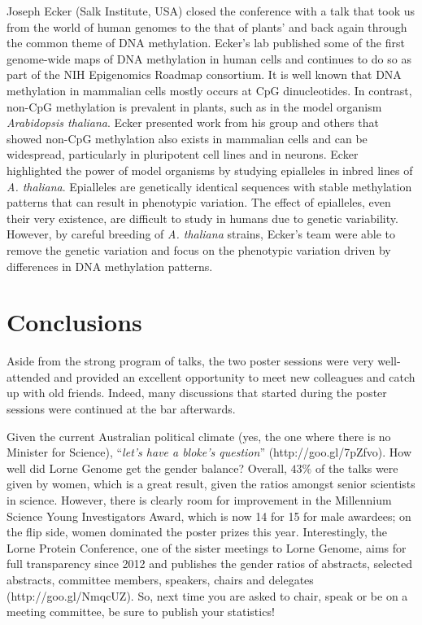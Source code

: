 \documentclass[twocolumn]{bmcart}%
\begin{document}
Joseph Ecker (Salk Institute, USA) closed the conference with a talk that took us from the world of human genomes to the that of plants' and back again through the common theme of DNA methylation. Ecker's lab published some of the first genome-wide maps of DNA methylation in human cells and continues to do so as part of the NIH Epigenomics Roadmap consortium. It is well known that DNA methylation in mammalian cells mostly occurs at CpG dinucleotides.  In contrast, non-CpG methylation is prevalent in plants, such as in the model organism \emph{Arabidopsis thaliana}. Ecker presented work from his group and others that showed non-CpG methylation also exists in mammalian cells and can be widespread, particularly in pluripotent cell lines and in neurons. Ecker highlighted the power of model organisms by studying epialleles in inbred lines of \emph{A. thaliana}. Epialleles are genetically identical sequences with stable methylation patterns that can result in phenotypic variation. The effect of epialleles, even their very existence, are difficult to study in humans due to genetic variability. However, by careful breeding of \emph{A. thaliana} strains, Ecker's team were able to remove the genetic variation and focus on the phenotypic variation driven by differences in DNA methylation patterns.

\section*{Conclusions}
Aside from the strong program of talks, the two poster sessions were very well-attended and provided an excellent opportunity to meet new colleagues and catch up with old friends. Indeed, many discussions that started during the poster sessions were continued at the bar afterwards. 

Given the current Australian political climate (yes, the one where there is no Minister for Science), ``{\em let's have a bloke's question}'' (http://goo.gl/7pZfvo).  How well did Lorne Genome get the gender balance?  Overall, $43\%$ of the talks were given by women, which is a great result, given the ratios amongst senior scientists in science.  However, there is clearly room for improvement in the Millennium Science Young Investigators Award, which is now 14 for 15 for male awardees; on the flip side, women dominated the poster prizes this year.  Interestingly, the Lorne Protein Conference, one of the sister meetings to Lorne Genome, aims for full transparency since 2012 and publishes the gender ratios of abstracts, selected abstracts, committee members, speakers, chairs and delegates (http://goo.gl/NmqcUZ).  So, next time you are asked to chair, speak or be on a meeting committee, be sure to publish your statistics!
\end{document}
